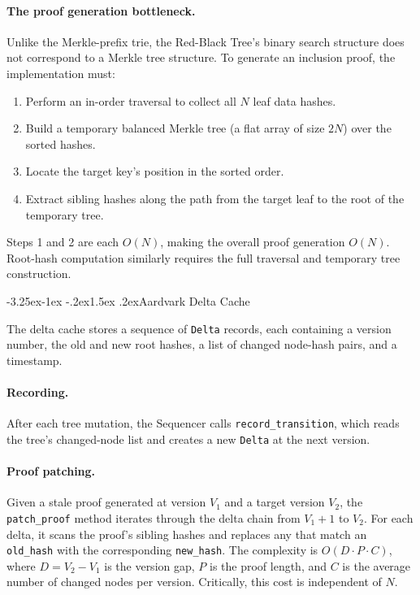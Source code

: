 \documentclass[letterpaper,twocolumn,10pt]{article}
\makeatletter
\renewcommand{\subsection}{\@startsection{subsection}{2}{\z@}%
  {-3.25ex\@plus -1ex \@minus -.2ex}{1.5ex \@plus .2ex}{\normalfont\normalsize\bfseries}}
\makeatother
\begin{document}
\paragraph{The proof generation bottleneck.}
Unlike the Merkle-prefix trie, the Red-Black Tree's binary search structure does not correspond to a Merkle tree structure.
To generate an inclusion proof, the implementation must:
\begin{enumerate}
  \item Perform an in-order traversal to collect all $N$ leaf data hashes.
  \item Build a temporary balanced Merkle tree (a flat array of size $2N$) over the sorted hashes.
  \item Locate the target key's position in the sorted order.
  \item Extract sibling hashes along the path from the target leaf to the root of the temporary tree.
\end{enumerate}
Steps 1 and 2 are each $O(N)$, making the overall proof generation $O(N)$.
Root-hash computation similarly requires the full traversal and temporary tree construction.

\subsection{Aardvark Delta Cache}

The delta cache stores a sequence of \texttt{Delta} records, each containing a version number, the old and new root hashes, a list of changed node-hash pairs, and a timestamp.

\paragraph{Recording.}
After each tree mutation, the Sequencer calls \texttt{record\_transition}, which reads the tree's changed-node list and creates a new \texttt{Delta} at the next version.

\paragraph{Proof patching.}
Given a stale proof generated at version $V_1$ and a target version $V_2$, the \texttt{patch\_proof} method iterates through the delta chain from $V_1 + 1$ to $V_2$.
For each delta, it scans the proof's sibling hashes and replaces any that match an \texttt{old\_hash} with the corresponding \texttt{new\_hash}.
The complexity is $O(D \cdot P \cdot C)$, where $D = V_2 - V_1$ is the version gap, $P$ is the proof length, and $C$ is the average number of changed nodes per version.
Critically, this cost is independent of $N$.
\end{document}
